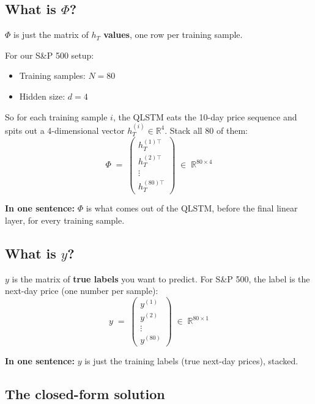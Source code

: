 \documentclass[11pt,a4paper]{article}
\begin{document}
\subsection{What is $\Phi$?}

$\Phi$ is just the matrix of \textbf{$h_T$ values}, one row per training sample.

For our S\&P 500 setup:
\begin{itemize}
  \item Training samples: $N = 80$
  \item Hidden size: $d = 4$
\end{itemize}

So for each training sample $i$, the QLSTM eats the 10-day price sequence and spits out a 4-dimensional vector $h_T^{(i)} \in \mathbb{R}^4$. Stack all 80 of them:
\[
  \Phi \;=\;
  \begin{pmatrix}
    h_T^{(1)\top} \\
    h_T^{(2)\top} \\
    \vdots \\
    h_T^{(80)\top}
  \end{pmatrix}
  \;\in\; \mathbb{R}^{80 \times 4}
\]

\textbf{In one sentence:} $\Phi$ is what comes out of the QLSTM, before the final linear layer, for every training sample.

\subsection{What is $y$?}

$y$ is the matrix of \textbf{true labels} you want to predict. For S\&P 500, the label is the next-day price (one number per sample):
\[
  y \;=\;
  \begin{pmatrix}
    y^{(1)} \\
    y^{(2)} \\
    \vdots \\
    y^{(80)}
  \end{pmatrix}
  \;\in\; \mathbb{R}^{80 \times 1}
\]

\textbf{In one sentence:} $y$ is just the training labels (true next-day prices), stacked.

\subsection{The closed-form solution}
\end{document}
